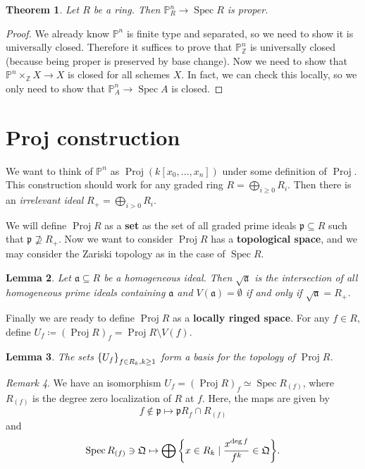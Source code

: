 \documentclass[leqno, openany]{memoir}
\newtheorem{thm}{Theorem}[section]
\newtheorem{lem}[thm]{Lemma}
\theoremstyle{definition}
\theoremstyle{remark}
\newtheorem{rmk}[thm]{Remark}
\theoremstyle{plain}
\theoremstyle{definition}
\theoremstyle{remark}
\newcommand{\Z}{\mathbb{Z}}
\renewcommand{\P}{\mathbb{P}}
\newcommand{\mf}[1]{\mathfrak{#1}}
\DeclareMathOperator{\Spec}{Spec}
\DeclareMathOperator{\Proj}{Proj}
\begin{document}
\begin{thm} Let $R$ be a ring. Then $\P^n_R \to \Spec R$ is proper.  \end{thm}

\begin{proof} We already know $\P^n$ is finite type and separated, so we need
    to show it is universally closed. Therefore it suffices to prove that
    $\P^n_{\Z}$ is universally closed (because being proper is preserved by
    base change). Now we need to show that $\P^n \times_{\Z} X \to X$ is closed
    for all schemes $X$. In fact, we can check this locally, so we only need to
    show that $\P^n_{A} \to \Spec A$ is closed.  \end{proof}

\section{Proj construction}%

We want to think of $\P^n$ as $\Proj(k[x_0, \ldots, x_n])$ under some
definition of $\Proj$. This construction should work for any graded ring $R =
\bigoplus_{i \geq 0} R_i$. Then there is an \textit{irrelevant ideal} $R_+ =
\bigoplus_{i > 0} R_i$. 

We will define $\Proj R$ as a \textbf{set} as the set of all graded prime
ideals $\mf{p} \subseteq R$ such that $\mf{p} \not\supseteq R_+$. Now we want
to consider $\Proj R$ has a \textbf{topological space}, and we may consider the
Zariski topology as in the case of $\Spec R$. 

\begin{lem} Let $\mf{a} \subseteq R$ be a homogeneous ideal. Then
$\sqrt{\mf{a}}$ is the intersection of all homogeneous prime ideals containing
$\mf{a}$ and $V(\mf{a}) = \emptyset$ if and only if $\sqrt{\mf{a}} = R_+$.
\end{lem}

Finally we are ready to define $\Proj R$ as a \textbf{locally ringed space}.
For any $f \in R$, define $U_f \coloneqq {(\Proj R)}_f = \Proj R \setminus
V(f)$. 

\begin{lem} The sets $\qty{U_f}_{f \in R_k, k \geq 1}$ form a basis for the
topology of $\Proj R$.  \end{lem}

\begin{rmk}\leavevmode We have an isomorphism $U_f = { (\Proj R) }_f \simeq
    \Spec R_{(f)}$, where $R_{(f)}$ is the degree zero localization of $R$ at
    $f$. Here, the maps are given by \[ f \notin \mf{p} \mapsto \mf{p} R_f \cap
    R_{(f)} \] and \[ \Spec R_{(f)} \ni \mf{Q} \mapsto \bigoplus \qty{x \in R_k
\mid \frac{x^{\deg f}}{f^k} \in \mf{Q}}. \] \end{rmk}
\end{document}

